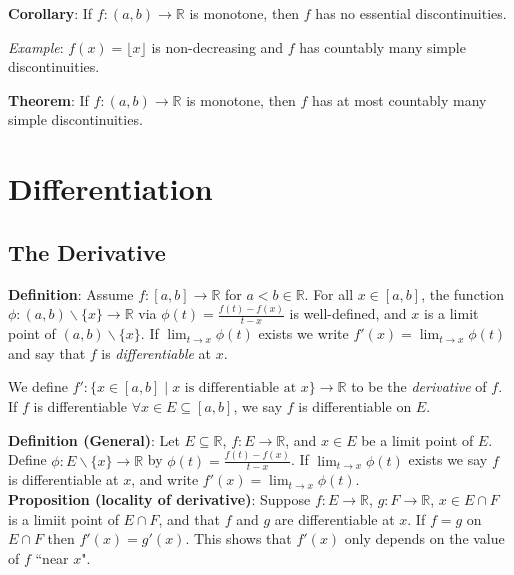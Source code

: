 \documentclass[11pt]{article}
\begin{document}
\textbf{Corollary}: If $f : (a,b) \to \mathbb{R}$ is monotone, then $f$ has no essential discontinuities.

\emph{Example}: $f(x) = \lfloor x \rfloor$ is non-decreasing and $f$ has countably many simple discontinuities.

\textbf{Theorem}: If $f : (a,b) \to \mathbb{R}$ is monotone, then $f$ has at most countably many simple discontinuities.


\section{Differentiation}

\subsection{The Derivative}

\textbf{Definition}: Assume $f : [a,b] \to \mathbb{R}$ for $a < b \in \mathbb{R}$. For all $x \in [a,b]$, the function $\phi : (a,b) \backslash \{x\} \to \mathbb{R}$ via $\phi(t) = \frac{f(t) - f(x)}{t - x}$ is well-defined, and $x$ is a limit point of $(a,b) \backslash \{x\}$. If $\lim_{t \to x} \phi(t)$ exists we write $f'(x) = \lim_{t \to x} \phi(t)$ and say that $f$ is \emph{differentiable} at $x$.

We define $f' : \{x \in [a,b] \;|\; x \text{ is differentiable at }x\} \to \mathbb{R}$ to be the \emph{derivative} of $f$. If $f$ is differentiable $\forall x \in E \subseteq [a,b]$, we say $f$ is differentiable on $E$.

\textbf{Definition (General)}: Let $E \subseteq \mathbb{R}$, $f : E \to \mathbb{R}$, and $x \in E$ be a limit point of $E$. Define $\phi : E \backslash \{x\} \to \mathbb{R}$ by $\phi(t) = \frac{f(t) - f(x)}{t-x}$. If $\lim_{t \to x} \phi(t)$ exists we say $f$ is differentiable at $x$, and write $f'(x) = \lim_{t \to x} \phi(t)$.\\

\textbf{Proposition (locality of derivative)}: Suppose $f : E \to \mathbb{R}$, $g : F \to \mathbb{R}$, $x \in E \cap F$ is a limiit point of $E \cap F$, and that $f$ and $g$ are differentiable at $x$. If $f = g$ on $E \cap F$ then $f'(x) = g'(x)$. This shows that $f'(x)$ only depends on the value of $f$ ``near $x$".
\end{document}
